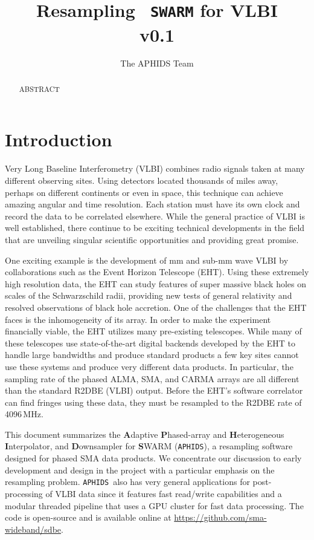 \documentclass[11pt,preprint]{aastex}
\newcommand{\SWARM}[1]{\texttt{#1\,SWARM}}
\newcommand{\APHIDS}{\texttt{APHIDS}}
\begin{document}
\title{Resampling \SWARM{} for VLBI \\ v0.1}

\author{The APHIDS Team}

\begin{abstract}
ABSTRACT
\end{abstract}

\section{Introduction}

Very Long Baseline Interferometry (VLBI) combines radio signals taken at many different observing sites.  Using
detectors located thousands of miles away, perhaps on different continents or even in space,
this technique can achieve amazing angular and time resolution.  Each station must have its own clock and record 
the data to be correlated elsewhere.  While the general practice of VLBI is well established, there continue to 
be exciting technical developments in the field that are unveiling singular scientific opportunities 
and providing great promise.

One exciting example is the development of mm and sub-mm wave VLBI by collaborations such as the Event Horizon
Telescope (EHT).  Using these extremely high resolution data, the EHT can study features of 
super massive black holes on scales of the Schwarzschild radii, providing new tests of general relativity and 
resolved observations of black hole accretion.  One of the challenges that the EHT faces is the inhomogeneity 
of its array.  In order to make the experiment financially viable, the EHT utilizes many pre-existing telescopes.
While many of these telescopes use state-of-the-art digital backends developed by the EHT to handle large 
bandwidths and produce standard products a few key sites cannot use these systems and produce very 
different data products. In particular, the sampling rate of the phased ALMA, SMA, and CARMA arrays are all 
different than the standard R2DBE (VLBI) output.  Before the EHT's software correlator
\citep[DIFX][]{deller07} can find fringes using these data, they must be resampled to the R2DBE rate of 
4096\,MHz.  

This document summarizes the \textbf{A}daptive \textbf{P}hased-array and \textbf{H}eterogeneous 
\textbf{I}nterpolator, and \textbf{D}ownsampler for \textbf{S}WARM (\APHIDS), a resampling software designed for 
phased SMA data products.  We concentrate our discussion to early development and design in the project with 
a particular emphasis on the resampling problem.  \APHIDS\, also has very general applications for 
post-processing of VLBI data since it features fast read/write capabilities and a modular threaded pipeline 
that uses a GPU cluster for fast data processing.  The code is open-source and is available online at 
\url{https://github.com/sma-wideband/sdbe}.
\end{document}
